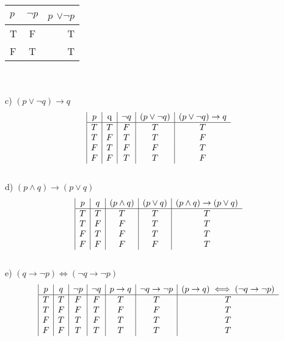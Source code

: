 \documentclass{article}
\begin{document}
\begin{flushleft}
\begin{tabular} {| l | c || r |}
  \hline
  $p$ & $\neg p$ & $p$ $\lor \neg p$ \\ \hline
  T & F & T \\ \hline
  F & T & T \\ \hline
\end{tabular} \\
~\\\setlength\parindent{24pt}c) $(p \lor \neg q) \rightarrow q$ \\
\begin{displaymath}
\begin{array} {| c | c | c | c | c }
  $$p$$
  & $q$
  & $$\neg q$$
  & $$(p \lor \neg q)$$
  & $$(p \lor \neg q) \rightarrow q$$ \\ \hline
T & T & F & T & T \\
T & F & T & T & F \\
F & T & F & F & T \\
F & F & T & T & F \\
\end{array}
\end{displaymath}
~\\\setlength\parindent{24pt}d) $(p \land q) \rightarrow (p \lor q)$
\begin{displaymath}
\begin{array} {| c | c | c | c | c }
  $$p$$
  & $$q$$
  & $$(p \land q)$$
  & $$(p \lor q)$$
  & $$(p \land q) \rightarrow (p \lor q)$$ \\ \hline
T & T & T & T & T \\
T & F & F & T & T \\
F & T & F & T & T \\
F & F & F & F & T \\
\end{array}
\end{displaymath}
~\\\setlength\parindent{24pt}e) $(q \rightarrow \neg p) \iff (\neg q \rightarrow \neg p)$ \\
\begin{displaymath}
\begin{array} {| c | c | c | c | c | c | c}
  $$p$$
  & $$q$$
  & $$\neg p$$
  & $$\neg q$$
  & $$p \rightarrow q$$
  & $$\neg q \rightarrow \neg p$$
  & $$(p \rightarrow q) \iff (\neg q \rightarrow \neg p)$$ \\ \hline
T & T & F & F & T & T & T \\
T & F & F & T & F & F & T \\
F & T & T & F & T & T & T \\
F & F & T & T & T & T & T \\

\end{array}
\end{displaymath}
\end{flushleft}
\end{document}
